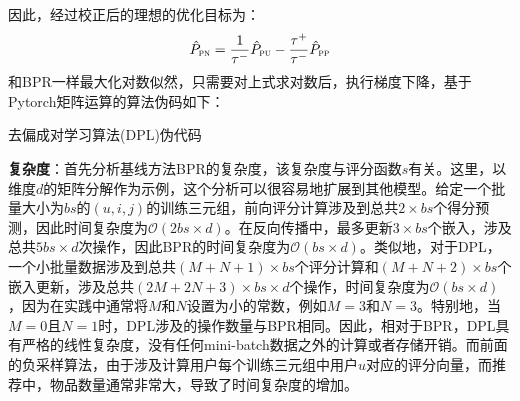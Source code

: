 因此，经过校正后的理想的优化目标为：
\[\hat{P}_\textsc{pn} = \frac{1}{\tau^-}
\hat{P}_\textsc{pu} - \frac{\tau^+}{\tau^-}\hat{P}_\textsc{pp} \]
和BPR一样最大化对数似然，只需要对上式求对数后，执行梯度下降，基于Pytorch矩阵运算的算法伪码如下：
\begin{algorithm}[!]
	\small
	\caption{去偏成对学习算法(DPL)伪代码}\label{4-Alg:2}
\end{algorithm}

\textbf{复杂度}：首先分析基线方法BPR的复杂度，该复杂度与评分函数$s$有关。这里，以维度$d$的矩阵分解作为示例，这个分析可以很容易地扩展到其他模型。给定一个批量大小为$bs$的$(u,i,j)$的训练三元组，前向评分计算涉及到总共$2\times bs$个得分预测，因此时间复杂度为$\mathcal O(2 bs\times d)$。在反向传播中，最多更新$3 \times bs$个嵌入，涉及总共$5bs\times d$次操作，因此BPR的时间复杂度为$\mathcal O(bs\times d)$。类似地，对于DPL，一个小批量数据涉及到总共$(M+N+1)\times bs$个评分计算和$(M+N+2)\times bs$个嵌入更新，涉及总共$(2M+2N+3)\times bs\times d$个操作，时间复杂度为$\mathcal O(bs\times d)$，因为在实践中通常将$M$和$N$设置为小的常数，例如$M=3$和$N=3$。特别地，当$M=0$且$N=1$时，DPL涉及的操作数量与BPR相同。因此，相对于BPR，DPL具有严格的线性复杂度，没有任何mini-batch数据之外的计算或者存储开销。而前面的负采样算法，由于涉及计算用户每个训练三元组中用户$u$对应的评分向量，而推荐中，物品数量通常非常大，导致了时间复杂度的增加。

